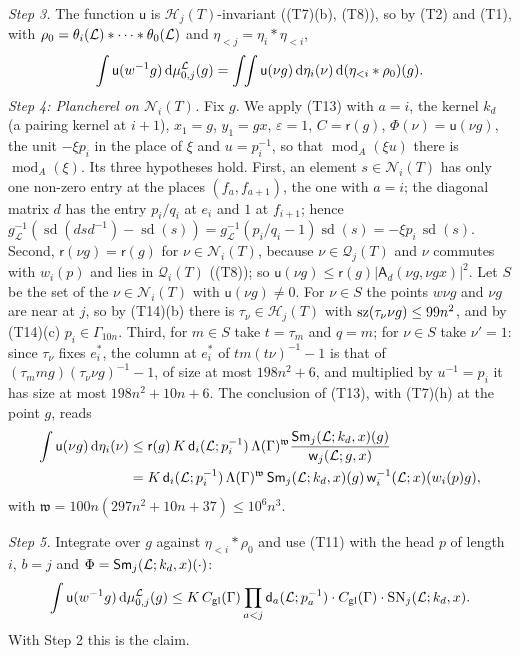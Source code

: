 \documentclass[11pt,a4paper]{article}
\makeatletter
\newcommand{\m}[1]{\mbox{$#1$}}        %
\theoremstyle{plainx}
\theoremstyle{uprightx}
\renewenvironment{proof}[1][Proof]{\par\pushQED{\qed}\normalfont\topsep0pt\partopsep0pt
  \trivlist\item[\hskip\labelsep\itshape #1.]\ignorespaces}{\popQED\endtrivlist\@endpefalse}
\newcommand{\cL}{\mathcal{L}}
\newcommand{\dd}{\mathrm{d}}
\newcommand{\Hl}[2]{\mathcal{H}_{#1}(#2)}
\newcommand{\Ql}[2]{\mathcal{Q}_{#1}(#2)}
\newcommand{\Nf}[2]{\mathcal{N}_{#1}(#2)}
\newcommand{\modA}{\operatorname{mod}_A}
\newcommand{\sd}{\operatorname{sd}}
\newcommand{\wl}[2]{w_{#1}(#2)}
\newcommand{\gL}[1]{g_{#1}}
\newcommand{\etab}[1]{\eta_{<#1}}
\newcommand{\Inp}[1]{\textup{(#1)}}
\makeatother
\begin{document}
\begin{proof}[Proof of Theorem A\textup{(c)}]
\emph{Step 3.} The function $\mathsf{u}$ is $\Hl{j}{T}$-invariant (\Inp{T7}(b), \Inp{T8}), so by \Inp{T2} and
\Inp{T1}, with $\rho_0=\floorMeasure{\cL}{i}*\dots*\floorMeasure{\cL}{0}$ and $\etab{j}=\eta_i*\etab{i}$,
\[\int\mathsf{u}(w^{-1}g)\,\dd\stackMeasure{\cL}_{0,j}(g)=\int\!\!\int\mathsf{u}(\nu g)\,\dd\eta_i(\nu)\,\dd(\etab{i}*\rho_0)(g).\]
\emph{Step 4: Plancherel on $\Nf{i}{T}$.} Fix $g$. We apply \Inp{T13} with $a=i$, the kernel $k_d$ (a pairing
kernel at $i+1$), $x_1=g$, $y_1=gx$, $\varepsilon=1$, $C=\mathsf{r}(g)$, $\Phi(\nu)=\mathsf{u}(\nu g)$, the unit
$-\xi p_i$ in the place of $\xi$ and $u=p_i^{-1}$, so that $\modA(\xi u)$ there is $\modA(\xi)$. Its three hypotheses
hold. First, an element $s\in\Nf{i}{T}$ has only one non-zero entry at the places $(f_a,f_{a+1})$, the one with
$a=i$; the diagonal matrix $d$ has the entry $p_i/q_i$ at $e_i$ and $1$ at $f_{i+1}$; hence
$\gL{\cL}^{-1}(\sd(dsd^{-1})-\sd(s))=\gL{\cL}^{-1}(p_i/q_i-1)\sd(s)=-\xi p_i\,\sd(s)$. Second, $\mathsf{r}(\nu g)=
\mathsf{r}(g)$ for $\nu\in\Nf{i}{T}$, because $\nu\in\Ql{j}{T}$ and $\nu$ commutes with $\wl{i}{p}$ and lies in
$\Ql{i}{T}$ (\Inp{T8}); so $\mathsf{u}(\nu g)\le\mathsf{r}(g)|\mathsf{A}_d(\nu g,\nu gx)|^2$. Let $S$ be the set of the
$\nu\in\Nf{i}{T}$ with $\mathsf{u}(\nu g)\ne0$. For $\nu\in S$ the points $w\nu g$ and $\nu g$ are near at $j$, so by
\Inp{T14}(b) there is $\tau_\nu\in\Hl{j}{T}$ with \m{\HasMatSize{99n^2}{\tau_\nu\nu g}}, and by \Inp{T14}(c)
$p_i\in\Gamma_{10n}$. Third, for $m\in S$ take $t=\tau_m$ and $q=m$; for $\nu\in S$ take $\nu'=1$: since
$\tau_\nu$ fixes $e^*_i$, the column at $e^*_i$ of $tm(t\nu)^{-1}-1$ is that of
$(\tau_mmg)(\tau_\nu\nu g)^{-1}-1$, of size at most $198n^2+6$, and multiplied by $u^{-1}=p_i$ it has size at
most $198n^2+10n+6$. The conclusion of \Inp{T13}, with \Inp{T7}(h) at the point $g$, reads
\[\begin{aligned}\int\mathsf{u}(\nu g)\,\dd\eta_i(\nu)&\le\mathsf{r}(g)\,K\,\floorModulus{\cL}{i}{p_i^{-1}}\,\Lambda(\Gamma)^{\mathfrak{w}}
\frac{\weightedSquareSum{\cL}{k_d}{x}{j}{g}}{\floorWeight{\cL}{j}{g}{x}}\\
&=K\,\floorModulus{\cL}{i}{p_i^{-1}}\,\Lambda(\Gamma)^{\mathfrak{w}}\,\weightedSquareSum{\cL}{k_d}{x}{j}{g}\,\invWeight{\cL}{i}{x}(\wl{i}{p}g),\end{aligned}\]
with $\mathfrak{w}=100n(297n^2+10n+37)\le10^6n^3$.

\emph{Step 5.} Integrate over $g$ against $\etab{i}*\rho_0$ and use \Inp{T11} with the head $p$ of length $i$, $b=j$
and $\Phi=\weightedSquareSum{\cL}{k_d}{x}{j}{\cdot}$:
\[\int\mathsf{u}(w^{-1}g)\,\dd\stackMeasure{\cL}_{0,j}(g)\le K\,\globalConst{\Gamma}\prod_{a<j}\floorModulus{\cL}{a}{p_a^{-1}}\cdot
\globalConst{\Gamma}\cdot\selfNorm{\cL}{j}{k_d}{x}.\]
With Step 2 this is the claim.
\end{proof}
\end{document}
